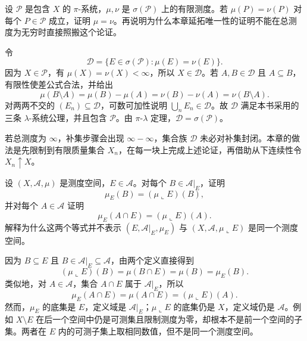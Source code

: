 \begin{exercise}
\label{b1:ex:0210}
设 \(\mathcal P\) 是包含 \(X\) 的 \(\pi\)-系统，\(\mu,\nu\) 是 \(\sigma(\mathcal P)\) 上的有限测度。若 \(\mu(P)=\nu(P)\) 对每个 \(P\in\mathcal P\) 成立，证明 \(\mu=\nu\)。再说明为什么本章延拓唯一性的证明不能在总测度为无穷时直接照搬这个论证。
\end{exercise}
\begin{solution}
令
\[
\mathcal D=\{E\in\sigma(\mathcal P):\mu(E)=\nu(E)\}.
\]
因为 \(X\in\mathcal P\)，有 \(\mu(X)=\nu(X)<\infty\)，所以 \(X\in\mathcal D\)。若 \(A,B\in\mathcal D\) 且 \(A\subseteq B\)，有限性使差公式合法，并给出
\[
\mu(B\setminus A)=\mu(B)-\mu(A)
=\nu(B)-\nu(A)=\nu(B\setminus A).
\]
对两两不交的 \((E_n)\subseteq\mathcal D\)，可数可加性说明 \(\bigcup_nE_n\in\mathcal D\)。故 \(\mathcal D\) 满足本书采用的三条 \(\lambda\)-系统公理，并且包含 \(\mathcal P\)。由 \(\pi\)-\(\lambda\) 定理，\(\mathcal D=\sigma(\mathcal P)\)。

若总测度为 \(\infty\)，补集步骤会出现 \(\infty-\infty\)，集合族 \(\mathcal D\) 未必对补集封闭。本章的做法是先限制到有限质量集合 \(X_n\)，在每一块上完成上述论证，再借助从下连续性令 \(X_n\uparrow X\)。
\end{solution}

\begin{exercise}
\label{b1:ex:0211}
设 \((X,\mathcal A,\mu)\) 是测度空间，\(E\in\mathcal A\)。对每个 \(B\in\mathcal A|_E\)，证明
\[
\mu_E(B)=(\mu\llcorner E)(B),
\]
并对每个 \(A\in\mathcal A\) 证明
\[
\mu_E(A\cap E)=(\mu\llcorner E)(A).
\]
解释为什么这两个等式并不表示 \((E,\mathcal A|_E,\mu_E)\) 与 \((X,\mathcal A,\mu\llcorner E)\) 是同一个测度空间。
\end{exercise}
\begin{solution}
因为 \(B\subseteq E\) 且 \(B\in\mathcal A|_E\subseteq\mathcal A\)，由两个定义直接得到
\[
(\mu\llcorner E)(B)=\mu(B\cap E)=\mu(B)=\mu_E(B).
\]
类似地，对 \(A\in\mathcal A\)，集合 \(A\cap E\) 属于 \(\mathcal A|_E\)，所以
\[
\mu_E(A\cap E)
=\mu(A\cap E)
=(\mu\llcorner E)(A).
\]
然而，\(\mu_E\) 的底集是 \(E\)，定义域是 \(\mathcal A|_E\)；\(\mu\llcorner E\) 的底集仍是 \(X\)，定义域仍是 \(\mathcal A\)。例如 \(X\setminus E\) 在后一个空间中仍是可测集且限制测度为零，却根本不是前一个空间的子集。两者在 \(E\) 内的可测子集上取相同数值，但不是同一个测度空间。
\end{solution}

